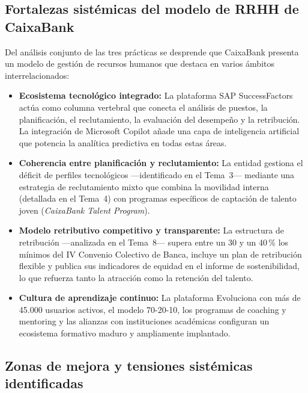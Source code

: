 \subsection{Fortalezas sistémicas del modelo de RRHH de CaixaBank}

Del análisis conjunto de las tres prácticas se desprende que CaixaBank
presenta un modelo de gestión de recursos humanos que destaca en varios
ámbitos interrelacionados:

\begin{itemize}
  \item \textbf{Ecosistema tecnológico integrado:} La plataforma SAP
        SuccessFactors actúa como columna vertebral que conecta el análisis
        de puestos, la planificación, el reclutamiento, la evaluación del
        desempeño y la retribución. La integración de Microsoft Copilot añade
        una capa de inteligencia artificial que potencia la analítica predictiva
        en todas estas áreas.

  \item \textbf{Coherencia entre planificación y reclutamiento:} La entidad
        gestiona el déficit de perfiles tecnológicos —identificado en el Tema~3—
        mediante una estrategia de reclutamiento mixto que combina la movilidad
        interna (detallada en el Tema~4) con programas específicos de captación
        de talento joven (\textit{CaixaBank Talent Program}).

  \item \textbf{Modelo retributivo competitivo y transparente:} La estructura
        de retribución —analizada en el Tema~8— supera entre un 30 y un 40\,\%
        los mínimos del IV Convenio Colectivo de Banca, incluye un plan de
        retribución flexible y publica sus indicadores de equidad en el informe
        de sostenibilidad, lo que refuerza tanto la atracción como la retención
        del talento.

  \item \textbf{Cultura de aprendizaje continuo:} La plataforma Evoluciona
        con más de 45.000 usuarios activos, el modelo 70-20-10, los programas
        de coaching y mentoring y las alianzas con instituciones académicas
        configuran un ecosistema formativo maduro y ampliamente implantado.
\end{itemize}

\subsection{Zonas de mejora y tensiones sistémicas identificadas}


